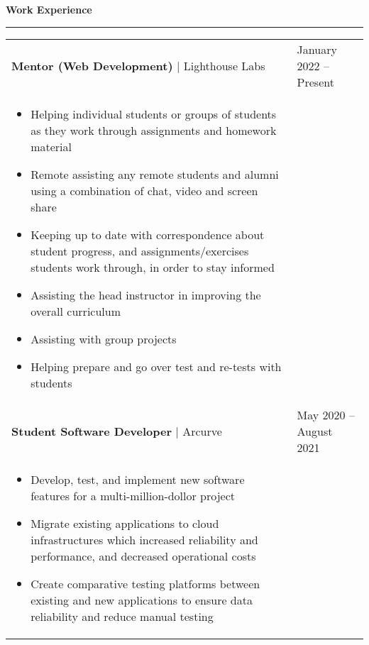 \documentclass[11pt]{article}
\newenvironment{compactList}
{
  \begin{itemize}
    \setlength{\itemsep}{0pt}
    \setlength{\parskip}{0pt}
}
{\end{itemize}}
\begin{document}
\begin{center}
  \textbf{Work Experience}
  \noindent\rule[10pt]{0.9\paperwidth}{0.4pt}
\end{center}
\vspace{-20pt}
\begin{tabularx}{\textwidth\setlength{\extrarowheight}{5pt}}
  {
    >{\hsize=1.5\hsize\raggedright\arraybackslash}X
    >{\hsize=0.5\hsize\raggedleft\arraybackslash}X
  }
  \textbf{Mentor (Web Development)} $\vert$ Lighthouse Labs               & January 2022 – Present \\
  \multicolumn{2}{>{\hsize=\dimexpr2\hsize+2\tabcolsep+\arrayrulewidth\relax}X}
  {
    \begin{minipage}{0.85\paperwidth}
      \begin{compactList}
        \item Helping individual students or groups of students as they work through assignments and homework material
        \item Remote assisting any remote students and alumni using a combination of chat, video and screen share
        \item Keeping up to date with correspondence about student progress, and assignments/exercises students work through, in order to stay informed
        \item Assisting the head instructor in improving the overall curriculum
        \item Assisting with group projects
        \item Helping prepare and go over test and re-tests with students
      \end{compactList}
    \end{minipage}
  }
  \\
  \textbf{Student Software Developer} $\vert$ Arcurve                     & May 2020 – August 2021 \\
  \multicolumn{2}{>{\hsize=\dimexpr2\hsize+2\tabcolsep+\arrayrulewidth\relax}X}
  {
    \begin{minipage}{0.85\paperwidth}
      \begin{compactList}
        \item Develop, test, and implement new software features for a multi-million-dollor project
        \item Migrate existing applications to cloud infrastructures which increased reliability and performance, and decreased operational costs
        \item Create comparative testing platforms between existing and new applications to ensure data reliability and reduce manual testing

\end{compactList}
\end{minipage}}
\end{tabularx}
\end{document}
